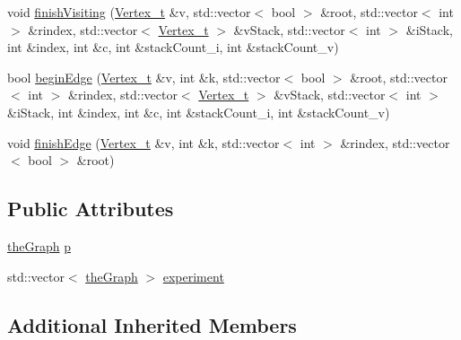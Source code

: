 \begin{DoxyCompactItemize}
\item 
void \hyperlink{class_pearce_a48afb6ccb75ba9df285c9701daf474b0_a48afb6ccb75ba9df285c9701daf474b0}{finish\+Visiting} (\hyperlink{class_graph_component_ae67114a6ce5a001dc35e1996e1b45aa0_ae67114a6ce5a001dc35e1996e1b45aa0}{Vertex\+\_\+t} \&v, std\+::vector$<$ bool $>$ \&root, std\+::vector$<$ int $>$ \&rindex, std\+::vector$<$ \hyperlink{class_graph_component_ae67114a6ce5a001dc35e1996e1b45aa0_ae67114a6ce5a001dc35e1996e1b45aa0}{Vertex\+\_\+t} $>$ \&v\+Stack, std\+::vector$<$ int $>$ \&i\+Stack, int \&index, int \&c, int \&stack\+Count\+\_\+i, int \&stack\+Count\+\_\+v)
\item 
bool \hyperlink{class_pearce_a6d6c641f1815e11536554077ed18c10e_a6d6c641f1815e11536554077ed18c10e}{begin\+Edge} (\hyperlink{class_graph_component_ae67114a6ce5a001dc35e1996e1b45aa0_ae67114a6ce5a001dc35e1996e1b45aa0}{Vertex\+\_\+t} \&v, int \&k, std\+::vector$<$ bool $>$ \&root, std\+::vector$<$ int $>$ \&rindex, std\+::vector$<$ \hyperlink{class_graph_component_ae67114a6ce5a001dc35e1996e1b45aa0_ae67114a6ce5a001dc35e1996e1b45aa0}{Vertex\+\_\+t} $>$ \&v\+Stack, std\+::vector$<$ int $>$ \&i\+Stack, int \&index, int \&c, int \&stack\+Count\+\_\+i, int \&stack\+Count\+\_\+v)
\item 
void \hyperlink{class_pearce_a4ed2b91ac3246895ec5d70fe3530690e_a4ed2b91ac3246895ec5d70fe3530690e}{finish\+Edge} (\hyperlink{class_graph_component_ae67114a6ce5a001dc35e1996e1b45aa0_ae67114a6ce5a001dc35e1996e1b45aa0}{Vertex\+\_\+t} \&v, int \&k, std\+::vector$<$ int $>$ \&rindex, std\+::vector$<$ bool $>$ \&root)
\end{DoxyCompactItemize}
\subsection*{Public Attributes}
\begin{DoxyCompactItemize}
\item 
\hyperlink{class_graph_component_a982e0748a6e1b8dc74986f5f8b3dca5c_a982e0748a6e1b8dc74986f5f8b3dca5c}{the\+Graph} \hyperlink{class_pearce_a2320928312fd97f6bcb1f16684f79a03_a2320928312fd97f6bcb1f16684f79a03}{p}
\item 
std\+::vector$<$ \hyperlink{class_graph_component_a982e0748a6e1b8dc74986f5f8b3dca5c_a982e0748a6e1b8dc74986f5f8b3dca5c}{the\+Graph} $>$ \hyperlink{class_pearce_ad33eb33876fe817143afb84583934313_ad33eb33876fe817143afb84583934313}{experiment}
\end{DoxyCompactItemize}
\subsection*{Additional Inherited Members}


